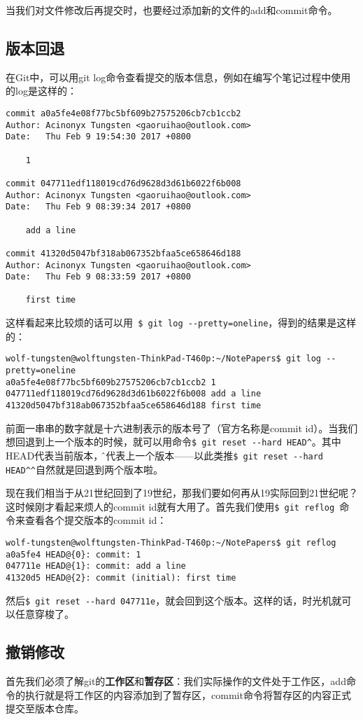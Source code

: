 \documentclass[UTF8]{ctexart}
\begin{document}
当我们对文件修改后再提交时，也要经过添加新的文件的add和commit命令。

\subsection{版本回退}
在Git中，可以用git log命令查看提交的版本信息，例如在编写个笔记过程中使用的log是这样的：
\begin{lstlisting}
commit a0a5fe4e08f77bc5bf609b27575206cb7cb1ccb2
Author: Acinonyx Tungsten <gaoruihao@outlook.com>
Date:   Thu Feb 9 19:54:30 2017 +0800

    1

commit 047711edf118019cd76d9628d3d61b6022f6b008
Author: Acinonyx Tungsten <gaoruihao@outlook.com>
Date:   Thu Feb 9 08:39:34 2017 +0800

    add a line

commit 41320d5047bf318ab067352bfaa5ce658646d188
Author: Acinonyx Tungsten <gaoruihao@outlook.com>
Date:   Thu Feb 9 08:33:59 2017 +0800

    first time
\end{lstlisting}

这样看起来比较烦的话可以用\verb！ $ git log --pretty=oneline！，得到的结果是这样的：
\begin{lstlisting}
wolf-tungsten@wolftungsten-ThinkPad-T460p:~/NotePapers$ git log --pretty=oneline
a0a5fe4e08f77bc5bf609b27575206cb7cb1ccb2 1
047711edf118019cd76d9628d3d61b6022f6b008 add a line
41320d5047bf318ab067352bfaa5ce658646d188 first time
\end{lstlisting}

前面一串串的数字就是十六进制表示的版本号了（官方名称是commit id）。当我们想回退到上一个版本的时候，就可以用命令\verb!$ git reset --hard HEAD^!。其中HEAD代表当前版本，\^就代表上一个版本——以此类推\verb!$ git reset --hard HEAD^^!自然就是回退到两个版本啦。

现在我们相当于从21世纪回到了19世纪，那我们要如何再从19实际回到21世纪呢？这时候刚才看起来烦人的commit id就有大用了。首先我们使用\verb!$ git reflog !命令来查看各个提交版本的commit id：
\begin{lstlisting}[caption=bash command]
wolf-tungsten@wolftungsten-ThinkPad-T460p:~/NotePapers$ git reflog
a0a5fe4 HEAD@{0}: commit: 1
047711e HEAD@{1}: commit: add a line
41320d5 HEAD@{2}: commit (initial): first time
\end{lstlisting}
然后\verb!$ git reset --hard 047711e!，就会回到这个版本。这样的话，时光机就可以任意穿梭了。

\subsection{撤销修改}
首先我们必须了解git的\textbf{工作区}和\textbf{暂存区}：我们实际操作的文件处于工作区，add命令的执行就是将工作区的内容添加到了暂存区，commit命令将暂存区的内容正式提交至版本仓库。
\end{document}
